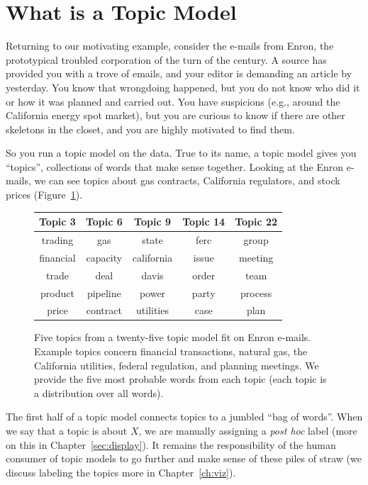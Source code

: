 \section{What is a Topic Model}

Returning to our motivating example, consider the e-mails from Enron, the prototypical
troubled corporation of the turn of the century.  A source has provided you with a trove of emails, and your editor is demanding an article by yesterday.  You know
that wrongdoing happened, but you do not know who did it or how it was planned
and carried out.  You have suspicions (e.g., around the California energy spot market),
but you are curious to know if there are other skeletons in the closet, and
you are highly motivated to find them.

So you run a topic model on the data.  True to its name, a topic model
gives you ``topics'', collections of words that make sense together.
Looking at the Enron e-mails, we can see topics about gas contracts,
California regulators, and stock prices
(Figure~\ref{fig:enron_topics}).

\begin{figure}
\begin{center}
  \begin{tabular}{ccccc}
    Topic 3    & Topic 6   & Topic 9    & Topic 14 & Topic 22 \\
    \hline
    trading    & gas       & state      & ferc     & group \\
    financial  & capacity  & california & issue    & meeting \\
    trade      & deal      & davis      & order    & team \\
    product    & pipeline  & power      & party    & process \\
    price      & contract  & utilities  & case     & plan \\
    \hline
  \end{tabular}
\end{center}

  \caption{Five topics from a twenty-five topic model fit on Enron
    e-mails.  Example topics concern financial transactions, natural
    gas, the California utilities, federal regulation, and planning
    meetings.  We provide the five most probable words from each topic
  (each topic is a distribution over all words).}
  \label{fig:enron_topics}
\end{figure}

The first half of a topic model connects topics to a jumbled ``bag of words''.
When we say that a topic is about $X$, we are manually assigning a \textit{post hoc} label
 (more on this in Chapter~\ref{sec:display}).
It remains the responsibility of the human consumer of topic models to go further and
make sense of these piles of straw (we discuss labeling the topics
more in Chapter~\ref{ch:viz}).

